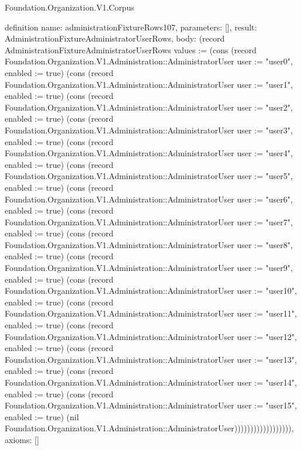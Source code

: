 \begin{lexlean}{Foundation.Organization.V1.Corpus}
\begin{semanticmodule}
definition{
  name: administrationFixtureRows107,
  parameters: [],
  result: AdministrationFixtureAdministratorUserRows,
  body: (record AdministrationFixtureAdministratorUserRows {values := (cons (record Foundation.Organization.V1.Administration::AdministratorUser {user := "user0", enabled := true}) (cons (record Foundation.Organization.V1.Administration::AdministratorUser {user := "user1", enabled := true}) (cons (record Foundation.Organization.V1.Administration::AdministratorUser {user := "user2", enabled := true}) (cons (record Foundation.Organization.V1.Administration::AdministratorUser {user := "user3", enabled := true}) (cons (record Foundation.Organization.V1.Administration::AdministratorUser {user := "user4", enabled := true}) (cons (record Foundation.Organization.V1.Administration::AdministratorUser {user := "user5", enabled := true}) (cons (record Foundation.Organization.V1.Administration::AdministratorUser {user := "user6", enabled := true}) (cons (record Foundation.Organization.V1.Administration::AdministratorUser {user := "user7", enabled := true}) (cons (record Foundation.Organization.V1.Administration::AdministratorUser {user := "user8", enabled := true}) (cons (record Foundation.Organization.V1.Administration::AdministratorUser {user := "user9", enabled := true}) (cons (record Foundation.Organization.V1.Administration::AdministratorUser {user := "user10", enabled := true}) (cons (record Foundation.Organization.V1.Administration::AdministratorUser {user := "user11", enabled := true}) (cons (record Foundation.Organization.V1.Administration::AdministratorUser {user := "user12", enabled := true}) (cons (record Foundation.Organization.V1.Administration::AdministratorUser {user := "user13", enabled := true}) (cons (record Foundation.Organization.V1.Administration::AdministratorUser {user := "user14", enabled := true}) (cons (record Foundation.Organization.V1.Administration::AdministratorUser {user := "user15", enabled := true}) (nil Foundation.Organization.V1.Administration::AdministratorUser)))))))))))))))))}),
  axioms: []
}


\end{semanticmodule}
\end{lexlean}
